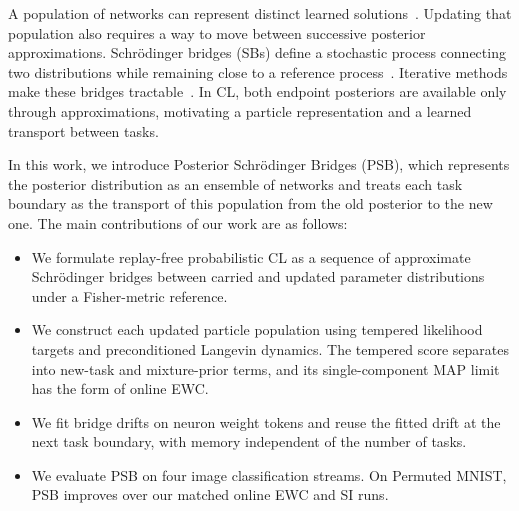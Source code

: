 \documentclass{article}
\begin{document}
A population of networks can represent distinct learned solutions~\cite{lakshminarayanan2017ensembles}. Updating that population also
requires a way to move between successive posterior approximations.
Schr\"odinger bridges (SBs) define a stochastic process connecting two
distributions while remaining close to a reference process~\cite{leonard2014survey}. Iterative methods make these bridges
tractable~\cite{debortoli2021dsb,shi2023dsbm}. In CL, both endpoint
posteriors are available only through approximations, motivating a
particle representation and a learned transport between tasks.

In this work, we introduce Posterior Schr\"odinger Bridges (PSB), which represents the posterior distribution as an ensemble of networks and treats each task boundary as the transport of this population from the old posterior to the new one. The main contributions of our work are as follows:

\begin{itemize}
  \item We formulate replay-free probabilistic CL as a sequence of
  approximate Schr\"odinger bridges between carried and updated
  parameter distributions under a Fisher-metric reference.

  \item We construct each updated particle population using tempered
  likelihood targets and preconditioned Langevin dynamics. The
  tempered score separates into new-task and mixture-prior terms,
  and its single-component MAP limit has the form of online EWC.

  \item We fit bridge drifts on neuron weight tokens and reuse the
  fitted drift at the next task boundary, with memory independent
  of the number of tasks.

  \item We evaluate PSB on four image classification streams. On
  Permuted MNIST, PSB improves over our matched online EWC and SI
  runs. 
\end{itemize}


\end{document}
